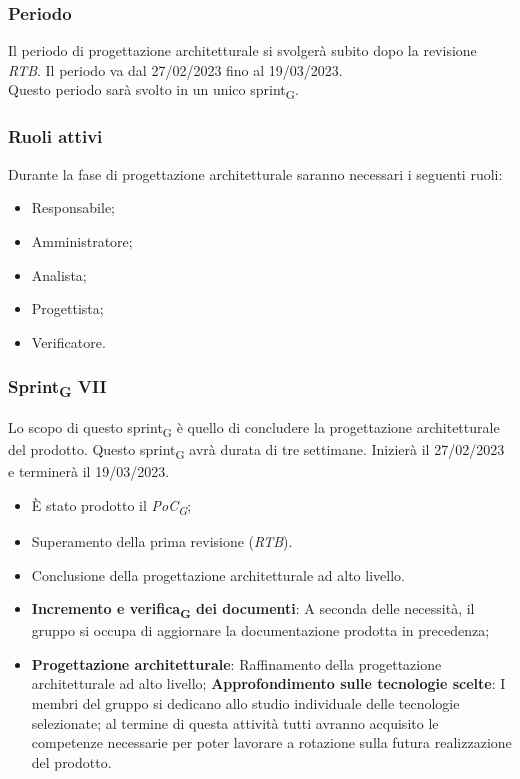 \subsubsection{Periodo}
Il periodo di progettazione architetturale si svolgerà subito dopo la revisione \textit{RTB}. Il periodo va dal 27/02/2023 fino al 19/03/2023.\\
Questo periodo sarà svolto in un unico sprint\textsubscript{G}.

\subsubsection{Ruoli attivi}
Durante la fase di progettazione architetturale saranno necessari i seguenti ruoli:
\begin{itemize}
	\item Responsabile;
    \item Amministratore;
    \item Analista;
    \item Progettista;
    \item Verificatore.
\end{itemize}

\subsubsection{Sprint\textsubscript{G} VII}
Lo scopo di questo sprint\textsubscript{G} è quello di concludere la progettazione architetturale del prodotto.
Questo sprint\textsubscript{G} avrà durata di tre settimane. Inizierà il 27/02/2023 e terminerà il 19/03/2023.

\:
\begin{itemize}
    \item È stato prodotto il \textit{PoC\textsubscript{G}};
    \item Superamento della prima revisione (\textit{RTB}).
\end{itemize}

\:
\begin{itemize}
    \item Conclusione della progettazione architetturale ad alto livello.
\end{itemize}

\:
\begin{itemize}
    \item \textbf{Incremento e verifica\textsubscript{G} dei documenti}: A seconda delle necessità, il gruppo si occupa di aggiornare la documentazione prodotta in precedenza;
    \item \textbf{Progettazione architetturale}: Raffinamento della progettazione architetturale ad alto livello;
        \subitem \textbf{Approfondimento sulle tecnologie scelte}: I membri del gruppo si dedicano allo studio individuale delle tecnologie selezionate; al termine di questa attività tutti avranno acquisito le competenze necessarie per poter lavorare a rotazione sulla futura realizzazione del prodotto.
\end{itemize}

